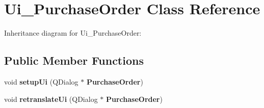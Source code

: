 \section{Ui\+\_\+\+Purchase\+Order Class Reference}
\label{class_ui___purchase_order}


Inheritance diagram for Ui\+\_\+\+Purchase\+Order\+:
\subsection*{Public Member Functions}
\begin{DoxyCompactItemize}
\item 
\mbox{\label{class_ui___purchase_order_a9dfad5a0641eaf2e61711580e0555dba}} 
void {\bfseries setup\+Ui} (Q\+Dialog $\ast$\textbf{ Purchase\+Order})
\item 
\mbox{\label{class_ui___purchase_order_a594e9b781c147fad40b9ae4f22864036}} 
void {\bfseries retranslate\+Ui} (Q\+Dialog $\ast$\textbf{ Purchase\+Order})
\end{DoxyCompactItemize}
